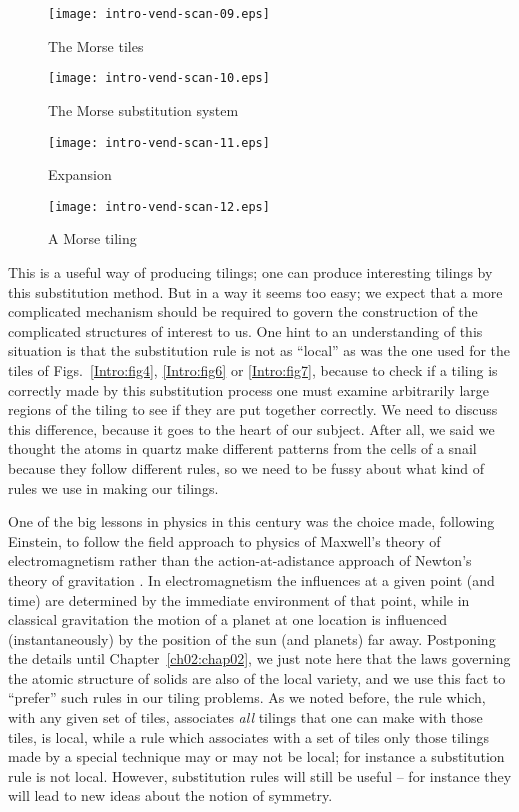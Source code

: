 \documentclass[reqno]{stml-l}
\theoremstyle{plain}
\theoremstyle{definition}
\numberwithin{equation}{chapter}
\begin{document}
\begin{figure}[h]
\texttt{[image: intro-vend-scan-09.eps]}
\caption{The Morse tiles}
\label{Intro:fig9}
\end{figure}

\begin{figure}[h]
\texttt{[image: intro-vend-scan-10.eps]}
\caption{The Morse substitution system}
\label{Intro:fig10}
\end{figure}

\begin{figure}[h]
\texttt{[image: intro-vend-scan-11.eps]}
\caption{Expansion}
\label{Intro:fig11}
\end{figure}

\begin{figure}[h]
\texttt{[image: intro-vend-scan-12.eps]}
\caption{A Morse tiling}
\label{Intro:fig12}
\end{figure}

This is a useful way of producing tilings; one can produce
interesting tilings by this substitution method. But in a
way it seems too easy; we expect that a more complicated
mechanism should be required to govern the construction of
the complicated structures of interest to us. One hint to
an understanding of this situation is that the substitution
rule is not as ``local'' as was the one used for the tiles
of Figs.~\ref{Intro:fig4}, \ref{Intro:fig6} or
\ref{Intro:fig7}, because to check if a tiling is correctly
made by this substitution process one must examine
arbitrarily large regions of the tiling to see if they are
put together correctly. We need to discuss this difference,
because it goes to the heart of our subject. After all, we
said we thought the atoms in quartz make different patterns
from the cells of a snail because they follow different
rules, so we need to be fussy about what kind of rules we
use in making our tilings.

One of the big lessons in physics in this century was the
choice made, following Einstein, to follow the field
approach to physics of Maxwell's
theory of electromagnetism rather than the
action-at-adistance approach of Newton's theory of
gravitation \cite{bib:EiI}. In electromagnetism the
influences at a given point (and time) are determined by
the immediate environment of that point, while in classical
gravitation the motion of a planet at one location is
influenced (instantaneously) by the position of the sun
(and planets) far away. Postponing the details until
Chapter~\ref{ch02:chap02}, we just note here that the laws
governing the atomic structure of solids are also of the
local variety, and we use this fact to ``prefer'' such
rules in our tiling problems. As we noted before, the rule
which, with any given set of tiles, associates \emph{all}
tilings that one can make with those tiles, is local, while
a rule which associates with a set of tiles only those
tilings made by a special technique may or may not be
local; for instance a substitution rule is not local.
However, substitution rules will still be useful -- for
instance they will lead to new ideas about the notion of
symmetry.
\end{document}
